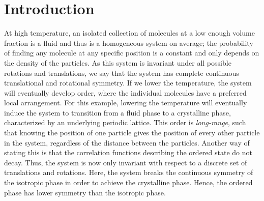 \chapter{Introduction}\label{c:1}
At high temperature, an isolated collection of molecules at a low enough volume fraction is a fluid and thus is a homogeneous system on average; the probability of finding any molecule at any specific position is a constant and only depends on the density of the particles.
As this system is invariant under all possible rotations and translations, we say that the system has complete continuous translational and rotational symmetry.
If we lower the temperature, the system will eventually develop order, where the individual molecules have a preferred local arrangement.
For this example, lowering the temperature will eventually induce the system to transition from a fluid phase to a crystalline phase, characterized by an underlying periodic lattice.
This order is \emph{long-range}, such that knowing the position of one particle gives the position of every other particle in the system, regardless of the distance between the particles.
Another way of stating this is that the correlation functions describing the ordered state do not decay.
Thus, the system is now only invariant with respect to a discrete set of translations and rotations.
Here, the system breaks the continuous symmetry of the isotropic phase in order to achieve the crystalline phase.
Hence, the ordered phase has lower symmetry than the isotropic phase.

